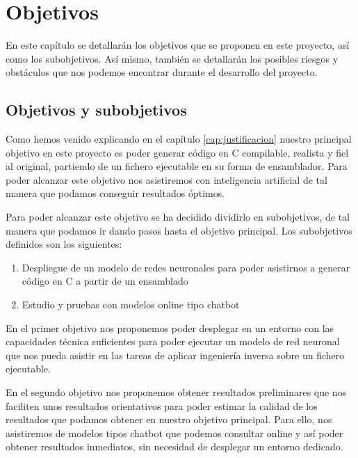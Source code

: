\chapter{Objetivos}
\label{cap:objetivos}


En este capítulo se detallarán los objetivos que se proponen en este proyecto, así
como los subobjetivos. Así mismo, también se detallarán los posibles riesgos y
obstáculos que nos podemos encontrar durante el desarrollo del proyecto.

\section{Objetivos y subobjetivos}
\label{sec:objetivos}


Como hemos venido explicando en el capítulo \ref{cap:justificacion} nuestro principal
objetivo en este proyecto es poder generar código en C compilable, realista y fiel
al original, partiendo de un fichero ejecutable en su forma de ensamblador. Para
poder alcanzar este objetivo nos asistiremos con inteligencia artificial de tal
manera que podamos conseguir resultados óptimos.

Para poder alcanzar este objetivo se ha decidido dividirlo en subobjetivos, de tal
manera que podamos ir dando pasos hasta el objetivo principal. Los subobjetivos definidos
son los siguientes:

\begin{enumerate}
    \item Despliegue de un modelo de redes neuronales para poder asistirnos a generar
        código en C a partir de un ensamblado
    \item Estudio y pruebas con modelos online tipo chatbot
\end{enumerate}

En el primer objetivo nos proponemos poder desplegar en un entorno con las capacidades
técnica suficientes para poder ejecutar un modelo de red neuronal que nos pueda asistir en
las tareas de aplicar ingeniería inversa sobre un fichero ejecutable.

En el segundo objetivo nos proponemos obtener resultados preliminares que nos faciliten
unos resultados orientativos para poder estimar la calidad de los resultados que podamos
obtener en nuestro objetivo principal. Para ello, nos asistiremos de modelos tipos chatbot
que podemos consultar online y así poder obtener resultados inmediatos, sin necesidad
de desplegar un entorno dedicado.

